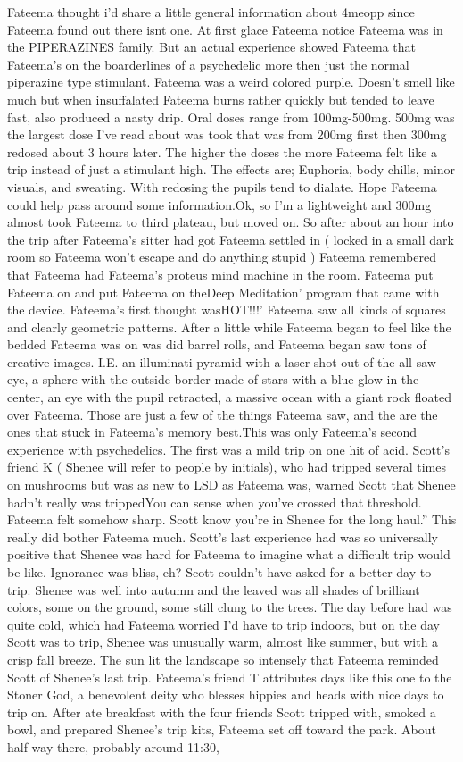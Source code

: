 \documentclass[12pt]{book}
\begin{document}
Fateema thought i'd share a little general information about 4meopp since Fateema found out there isnt one. At first glace Fateema notice Fateema was in the PIPERAZINES family. But an actual experience showed Fateema that Fateema's on the boarderlines of a psychedelic more then just the normal piperazine type stimulant. Fateema was a weird colored purple. Doesn't smell like much but when insuffalated Fateema burns rather quickly but tended to leave fast, also produced a nasty drip. Oral doses range from 100mg-500mg. 500mg was the largest dose I've read about was took that was from 200mg first then 300mg redosed about 3 hours later. The higher the doses the more Fateema felt like a trip instead of just a stimulant high. The effects are; Euphoria, body chills, minor visuals, and sweating. With redosing the pupils tend to dialate. Hope Fateema could help pass around some information.Ok, so I'm a lightweight and 300mg almost took Fateema to third plateau, but moved on. So after about an hour into the trip after Fateema's sitter had got Fateema settled in ( locked in a small dark room so Fateema won't escape and do anything stupid ) Fateema remembered that Fateema had Fateema's proteus mind machine in the room. Fateema put Fateema on and put Fateema on theDeep Meditation' program that came with the device. Fateema's first thought wasHOT!!!' Fateema saw all kinds of squares and clearly geometric patterns. After a little while Fateema began to feel like the bedded Fateema was on was did barrel rolls, and Fateema began saw tons of creative images. I.E. an illuminati pyramid with a laser shot out of the all saw eye, a sphere with the outside border made of stars with a blue glow in the center, an eye with the pupil retracted, a massive ocean with a giant rock floated over Fateema. Those are just a few of the things Fateema saw, and the are the ones that stuck in Fateema's memory best.This was only Fateema's second experience with psychedelics. The first was a mild trip on one hit of acid. Scott's friend K ( Shenee will refer to people by initials), who had tripped several times on mushrooms but was as new to LSD as Fateema was, warned Scott that Shenee hadn't really was trippedYou can sense when you've crossed that threshold. Fateema felt somehow sharp. Scott know you're in Shenee for the long haul.'' This really did bother Fateema much. Scott's last experience had was so universally positive that Shenee was hard for Fateema to imagine what a difficult trip would be like. Ignorance was bliss, eh? Scott couldn't have asked for a better day to trip. Shenee was well into autumn and the leaved was all shades of brilliant colors, some on the ground, some still clung to the trees. The day before had was quite cold, which had Fateema worried I'd have to trip indoors, but on the day Scott was to trip, Shenee was unusually warm, almost like summer, but with a crisp fall breeze. The sun lit the landscape so intensely that Fateema reminded Scott of Shenee's last trip. Fateema's friend T attributes days like this one to the Stoner God, a benevolent deity who blesses hippies and heads with nice days to trip on. After ate breakfast with the four friends Scott tripped with, smoked a bowl, and prepared Shenee's trip kits, Fateema set off toward the park. About half way there, probably around 11:30, 
\end{document}

